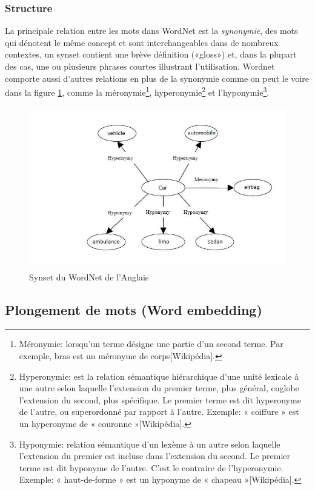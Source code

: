         \subsubsection{Structure}
        La principale relation entre les mots dans WordNet est la \emph{synonymie}, des mots qui dénotent le même concept et sont interchangeables dans de nombreux contextes, un synset contient une brève définition («gloss») et, dans la plupart des cas, une ou plusieurs phrases courtes illustrant l'utilisation. Wordnet comporte aussi d'autres relations en plus de la synonymie comme on peut le voire dans la figure \ref{synset}, comme la méronymie\footnote{Méronymie: lorsqu'un terme désigne une partie d'un second terme. Par exemple, bras est un méronyme de corps[Wikipédia].}, hyperonymie\footnote{Hyperonymie: est la relation sémantique hiérarchique d'une unité lexicale à une autre selon laquelle l'extension du premier terme, plus général, englobe l'extension du second, plus spécifique. Le premier terme est dit hyperonyme de l'autre, ou superordonné par rapport à l'autre. Exemple: « coiffure » est un hyperonyme de « couronne »[Wikipédia].} et l'hyponymie\footnote{Hyponymie: relation sémantique d'un lexème à un autre selon laquelle l'extension du premier est incluse dans l'extension du second. Le premier terme est dit hyponyme de l'autre. C'est le contraire de l'hyperonymie. Exemple: « haut-de-forme » est un hyponyme de « chapeau »[Wikipédia].}. 
        \begin{figure}[H]
            \centering
                \includegraphics[height=200pt,width=330pt]{img/chapter2/wordnet.jpg}
            \caption{Synset du WordNet de l'Anglais}
            \label{synset}
        \end{figure}
    
    
    \subsection{Plongement de mots (Word embedding)}
    
